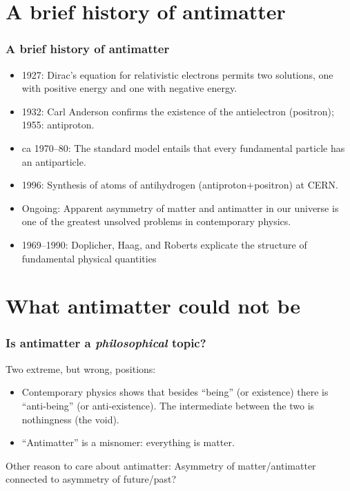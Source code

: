 \documentclass{beamer}
\begin{document}
\section{A brief history of antimatter}
\begin{frame}
\frametitle{A brief history of antimatter}
\begin{itemize}
\item 1927: Dirac's equation for relativistic electrons permits two
  solutions, one with positive energy and one with negative energy. \pause
\item 1932: Carl Anderson confirms the existence of the antielectron
  (positron); 1955: antiproton. \pause
\item ca 1970--80: The standard model entails that every fundamental
  particle has an antiparticle. \pause
\item 1996: Synthesis of atoms of antihydrogen (antiproton+positron)
  at CERN. \pause
\item Ongoing: Apparent asymmetry of matter and antimatter in our
  universe is one of the greatest unsolved problems in contemporary
  physics. \pause
\item 1969--1990: Doplicher, Haag, and Roberts explicate the structure
  of fundamental physical quantities
\end{itemize}

\end{frame}



\section{What antimatter could not be}
\begin{frame}
\frametitle{Is antimatter a \emph{philosophical} topic?}
\pause

Two extreme, but wrong, positions:
\begin{itemize}
\item Contemporary physics shows that besides ``being'' (or existence)
  there is ``anti-being'' (or anti-existence).  The intermediate
  between the two is nothingness (the void). \pause
\item ``Antimatter'' is a misnomer: everything is matter. \pause
\end{itemize}


\bigskip Other reason to care about antimatter: Asymmetry of
matter/antimatter connected to asymmetry of future/past? 



\end{frame}
\end{document}
